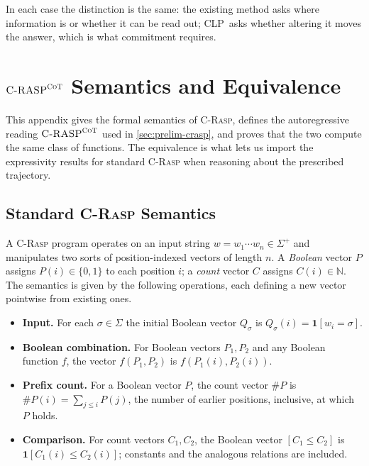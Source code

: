 \documentclass[11pt]{article}
\newcommand{\CLP}{\textsc{CLP}}
\newcommand{\CRASPCoT}{\textsc{C-RASP}^{\textsc{CoT}}}
\begin{document}
In each case the distinction is the same: the existing method asks where
information is or whether it can be read out; \CLP\ asks whether altering it
moves the answer, which is what commitment requires.

\section{\texorpdfstring{$\CRASPCoT$}{C-RASP-CoT} Semantics and Equivalence}
\label{app:craspcot}

This appendix gives the formal semantics of \textsc{C-Rasp}, defines the
autoregressive reading $\CRASPCoT$ used in \cref{sec:prelim-crasp}, and proves
that the two compute the same class of functions. The equivalence is what lets
us import the expressivity results for standard \textsc{C-Rasp}
\citep{DBLP:journals/corr/abs-2404-04393,DBLP:conf/nips/YangCCN25} when reasoning
about the prescribed trajectory.

\subsection{Standard \texorpdfstring{\textsc{C-Rasp}}{C-RASP} Semantics}
\label{app:craspcot-standard}

A \textsc{C-Rasp} program operates on an input string $w=w_{1}\cdots w_{n}\in
\Sigma^{+}$ and manipulates two sorts of position-indexed vectors of length $n$.
A \emph{Boolean} vector $P$ assigns $P(i)\in\{0,1\}$ to each position $i$; a
\emph{count} vector $C$ assigns $C(i)\in\mathbb{N}$. The semantics is given by
the following operations, each defining a new vector pointwise from existing
ones.

\begin{itemize}[leftmargin=*,topsep=2pt,itemsep=1pt]
\item \textbf{Input.} For each $\sigma\in\Sigma$ the initial Boolean vector
$Q_{\sigma}$ is $Q_{\sigma}(i)=\mathbf{1}[w_{i}=\sigma]$.
\item \textbf{Boolean combination.} For Boolean vectors $P_{1},P_{2}$ and any
Boolean function $f$, the vector $f(P_{1},P_{2})$ is $f(P_{1}(i),P_{2}(i))$.
\item \textbf{Prefix count.} For a Boolean vector $P$, the count vector
$\#P$ is $\#P(i)=\sum_{j\le i}P(j)$, the number of earlier positions, inclusive,
at which $P$ holds.
\item \textbf{Comparison.} For count vectors $C_{1},C_{2}$, the Boolean vector
$[C_{1}\le C_{2}]$ is $\mathbf{1}[C_{1}(i)\le C_{2}(i)]$; constants and the
analogous relations are included.
\end{itemize}
\end{document}
